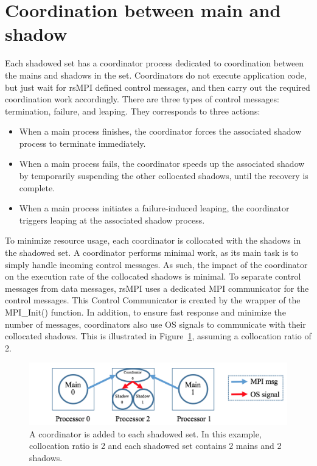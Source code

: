 \section{Coordination between main and shadow}
Each shadowed set has a coordinator process dedicated to coordination between the mains and shadows in the set. 
Coordinators do not execute application code, but just wait for rsMPI defined control messages, and then carry out the required 
coordination work accordingly. There are three types of control messages: termination, failure, and leaping. They corresponds to three actions:
\begin{itemize}
  \item When a main process finishes, the coordinator forces the associated shadow process to terminate immediately.
  \item When a main process fails, the coordinator speeds up the associated shadow by temporarily suspending the other collocated shadows, until the recovery is complete.
  \item When a main process initiates a failure-induced leaping, the coordinator triggers leaping at the associated shadow process.
\end{itemize}


To minimize resource usage, each coordinator is collocated with the shadows in the shadowed set. 
A coordinator performs  minimal work, as its main task is to simply handle incoming control messages.  As such, the impact of the coordinator on the execution rate of the collocated shadows is minimal. To separate control messages from data messages, rsMPI uses a dedicated MPI communicator for the control messages. This Control Communicator is created by the wrapper of the MPI\_Init() function. In addition, to ensure fast response and minimize the number of messages, coordinators also use OS signals to communicate with their collocated shadows. This is illustrated in Figure~\ref{fig:coordinator}, assuming a collocation ratio of 2.


\begin{figure}[!t]
  \begin{center}
      \includegraphics[width=\columnwidth]{Figures/coordinator}
  \end{center}
  \caption{A coordinator is added to each shadowed set. In this example, collocation ratio is 2 and each shadowed set contains 2 mains and 2 shadows.}
  \label{fig:coordinator}
\end{figure}




